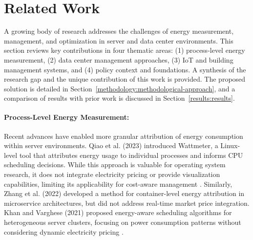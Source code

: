 

\section{Related Work}
\label{related_work:related-work}
A growing body of research addresses the challenges of energy measurement, management, and optimization in server and data center environments. This section reviews key contributions in four thematic areas: (1) process-level energy measurement, (2) data center management approaches, (3) IoT and building management systems, and (4) policy context and foundations. A synthesis of the research gap and the unique contribution of this work is provided. The proposed solution is detailed in Section~\ref{methodology:methodological-approach}, and a comparison of results with prior work is discussed in Section~\ref{results:results}.
\paragraph{\textbf{Process-Level Energy Measurement:}}
Recent advances have enabled more granular attribution of energy consumption within server environments. Qiao et al. (2023) introduced Wattmeter, a Linux-level tool that attributes energy usage to individual processes and informs CPU scheduling decisions. While this approach is valuable for operating system research, it does not integrate electricity pricing or provide visualization capabilities, limiting its applicability for cost-aware management \cite{qiao2023wattmeter}. Similarly, Zhang et al. (2022) developed a method for container-level energy attribution in microservice architectures, but did not address real-time market price integration. Khan and Varghese (2021) proposed energy-aware scheduling algorithms for heterogeneous server clusters, focusing on power consumption patterns without considering dynamic electricity pricing \cite{zhang2022container,khan2021energy}.
